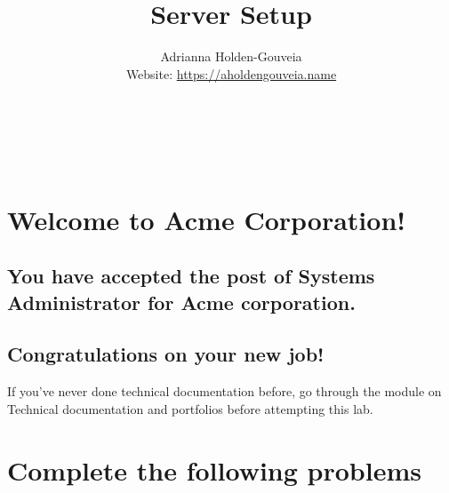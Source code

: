 \documentclass[12pt]{article}
\title{Server Setup}
\author{
        Adrianna Holden-Gouveia \\
        Website: \url{https://aholdengouveia.name}\\ 
        \date{\vspace{-5ex}}
        \faLinkedin{: aholdengouveia} \\
        \faGithub {: aholdengouveia} \\
        \faTwitter {: aholdengouveia} \\
        }
\begin{document}
    

\maketitle


\section*{Welcome to Acme Corporation!}
\subsection*{You have accepted the post of Systems Administrator for Acme corporation.} 
\subsection*{Congratulations on your new job!}

If you've never done technical documentation before, go through the module on Technical documentation and portfolios before attempting this lab.


\section*{Complete the following problems}
\end{document}
